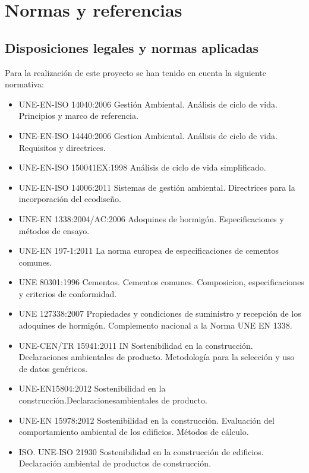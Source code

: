 \chapter{Normas y referencias}\label{cap:normas}
\section{Disposiciones legales y normas aplicadas}

Para la realización de este proyecto se han tenido en cuenta la siguiente normativa:

\begin{itemize}
  \item UNE-EN-ISO 14040:2006 Gestión Ambiental. Análisis de ciclo de vida. Principios y marco de referencia.
  \item UNE-EN-ISO 14440:2006 Gestion Ambiental. Análisis de ciclo de vida. Requisitos y directrices.
  \item UNE-EN-ISO 150041EX:1998 Análisis de ciclo de vida simplificado.
  \item UNE-EN-ISO 14006:2011 Sistemas de gestión ambiental. Directrices para la incorporación del ecodiseño.
  \item UNE-EN 1338:2004/AC:2006 Adoquines de hormigón. Especificaciones y métodos de ensayo.
  \item UNE-EN 197-1:2011 La norma europea de especificaciones de cementos comunes.
  \item UNE 80301:1996 Cementos. Cementos comunes. Composicion, especificaciones y criterios de conformidad.
  \item UNE 127338:2007 Propiedades y condiciones de suministro y recepción de los adoquines de hormigón. Complemento nacional a la Norma UNE EN 1338.
  \item UNE-CEN/TR 15941:2011 IN Sostenibilidad en la construcción. Declaraciones ambientales de producto. Metodología para la selección y uso de datos genéricos.
  \item UNE-EN15804:2012 Sostenibilidad en la construcción.Declaracionesambientales de producto.
  \item UNE-EN 15978:2012 Sostenibilidad en la construcción. Evaluación del comportamiento ambiental de los edificios. Métodos de cálculo.
  \item ISO. UNE-ISO 21930 Sostenibilidad en la construcción de edificios. Declaración ambiental de productos de construcción.
\end{itemize}

